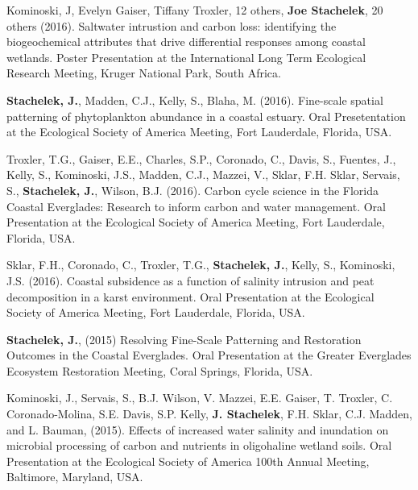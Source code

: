 \documentclass[10pt]{article}
\begin{document}
\begin{bibenum}

  \item Kominoski, J, Evelyn Gaiser, Tiffany Troxler, 12 others, \textbf{Joe Stachelek}, 20 others (2016). Saltwater intrustion and carbon loss: identifying the biogeochemical attributes that drive differential responses among coastal wetlands. Poster Presentation at the International Long Term Ecological Research Meeting, Kruger National Park, South Africa.

  \item \textbf{Stachelek, J.}, Madden, C.J., Kelly, S., Blaha, M. (2016). Fine-scale spatial patterning of phytoplankton abundance in a coastal estuary. Oral Presetentation at the Ecological Society of America Meeting, Fort Lauderdale, Florida, USA. %
% 
    \item Troxler, T.G., Gaiser, E.E., Charles, S.P., Coronado, C., Davis, S., Fuentes, J., Kelly, S., Kominoski, J.S., Madden, C.J., Mazzei, V., Sklar, F.H. Sklar, Servais, S., \textbf{Stachelek, J.}, Wilson, B.J. (2016). Carbon cycle science in the Florida Coastal Everglades: Research to inform carbon and water management. Oral Presentation at the Ecological Society of America Meeting, Fort Lauderdale, Florida, USA.
%   
    \item Sklar, F.H., Coronado, C., Troxler, T.G., \textbf{Stachelek, J.}, Kelly, S., Kominoski, J.S. (2016). Coastal subsidence as a function of salinity intrusion and peat decomposition in a karst environment. Oral Presentation at the Ecological Society of America Meeting, Fort Lauderdale, Florida, USA.
%   
    \item \textbf{Stachelek, J.}, (2015) Resolving Fine-Scale Patterning and Restoration Outcomes in the Coastal Everglades. Oral Presentation at the Greater Everglades Ecosystem Restoration Meeting, Coral Springs, Florida, USA. %
%   
    \item Kominoski, J., Servais, S., B.J. Wilson, V. Mazzei, E.E. Gaiser, T. Troxler, C. Coronado-Molina, S.E. Davis, S.P. Kelly, \textbf{J. Stachelek}, F.H. Sklar, C.J. Madden, and L. Bauman, (2015). Effects of increased water salinity and inundation on microbial processing of carbon and nutrients in oligohaline wetland soils. Oral Presentation at the Ecological Society of America 100th Annual Meeting, Baltimore, Maryland, USA.

\end{bibenum}
\end{document}
